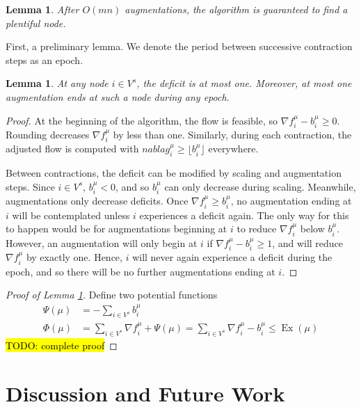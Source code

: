 \documentclass[11pt]{article}
\newtheorem{lemma}[theorem]{Lemma}
\theoremstyle{definition}
\theoremstyle{definition}
\theoremstyle{definition}
\newcommand{\fu}{f^{\mu}}
\newcommand{\nfiu}{\nabla \fu_i}
\newcommand{\biu}{b_{i}^{\mu}}
\newcommand{\vsrc}{V^{s}}
\DeclareMathOperator{\Ex}{Ex}
\renewcommand{\todo}[1]{\hl{TODO: #1}}
\begin{document}
    \begin{lemma} \label{lem.num-aug}
        After $O(mn)$ augmentations, the algorithm is guaranteed to find a plentiful node.
    \end{lemma}
    First, a preliminary lemma. We denote the period between successive contraction
    steps as an epoch.
    \begin{lemma}
    At any node $i \in \vsrc$, the deficit is at most one. Moreover, at most one augmentation
    ends at such a node during any epoch.
    \end{lemma}
    \begin{proof}
        At the beginning of the algorithm, the flow is feasible, so $\nfiu - \biu \geq 0$.
        Rounding decreases $\nfiu$ by less than one. Similarly, during each contraction,
        the adjusted flow is computed with $nabla g_i^\mu \geq \lfloor \biu \rfloor$ everywhere.

        Between contractions, the deficit can be modified by scaling and augmentation steps.
        Since $i \in \vsrc$, $\biu < 0$, and so $\biu$ can only decrease during scaling.
        Meanwhile, augmentations only decrease deficits.
        Once $\nfiu \geq \biu$, no augmentation ending at $i$ will be contemplated unless $i$
        experiences a deficit again. The only way for this to happen would be for
        augmentations beginning at $i$ to reduce $\nfiu$ below $\biu$. However,
        an augmentation will only begin at $i$ if
        $\nfiu - \biu \geq 1$, and will reduce $\nfiu$ by exactly one. Hence, $i$ will
        never again experience a deficit during the epoch, and so there will be no further
        augmentations ending at $i$.
    \end{proof}

    \begin{proof}[Proof of Lemma \ref{lem.num-aug}]
    Define two potential functions
    \begin{align*}
    \Psi(\mu) &= - \sum_{i \in \vsrc} \biu \\
    \Phi(\mu) &= \sum_{i \in \vsrc} \nfiu + \Psi(\mu) = \sum_{i \in \vsrc} \nfiu - \biu
               \leq \Ex(\mu)
    \end{align*}
    \todo{complete proof}
    \end{proof}


\section{Discussion and Future Work}\label{sec:discussion}
\end{document}
